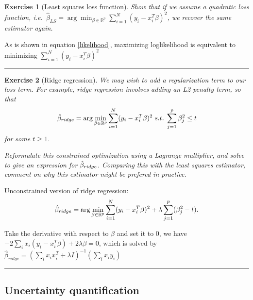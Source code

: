 \documentclass[twoside]{article}
\newcounter{lecnum}
\newtheorem{exercise}{Exercise}[lecnum]
\newenvironment{proof}{{\bf Proof:}}{\hfill\rule{2mm}{2mm}}
\begin{document}
\begin{exercise}[Least squares loss function]
  Show that if we assume a quadratic loss function, i.e.\ $\hat{\beta}_{LS} = \arg\min_{\beta\in \mathbb{R}^p}\sum_{i=1}^N(y_i - x_i^T\beta)^2$, we recover the same estimator again.
\end{exercise}

\begin{proof}
As is shown in equation \ref{likelihood}, maximizing loglikelihood is equivalent to minimizing $\sum_{i=1}^N(y_i - x_i^T\beta)^2$
\end{proof}
\begin{exercise}[Ridge regression]
  We may wish to add a regularization term to our loss term. For example, ridge regression involves adding an L2 penalty term, so that
  $$\hat{\beta}_{\small{ridge}} = \arg\min_{\beta\in \mathbb{R}^p}\sum_{i=1}^N(y_i - x_i^T\beta)^2 \; s.t. \; \sum_{j=1}^p \beta_j^2 \leq t$$
  for some $t\geq 1$.

  Reformulate this constrained optimization using a Lagrange multiplier, and solve to give an expression for $\hat{\beta}_{\small{ridge}}$. Comparing this with the least squares estimator, comment on why this estimator might be prefered in practice.
\end{exercise}
\begin{proof}
Unconstrained version of ridge regression:
$$\hat{\beta}_{\small{ridge}} = \arg\min_{\beta\in \mathbb{R}^p}\sum_{i=1}^N(y_i - x_i^T\beta)^2 + \lambda\sum_{j=1}^p (\beta_j^2-t).$$

Take the derivative with respect to $\beta$ and set it to $0$, we have $-2\sum_i x_i(y_i-x_i^T\beta) + 2\lambda \beta = 0$, which is solved by $\hat{\beta}_{ridge} = (\sum_ix_ix_i^T+ \lambda I)^{-1}(\sum_ix_iy_i)$
\end{proof}
  
\subsection{Uncertainty quantification}
\end{document}
